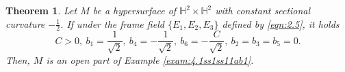 \documentclass[reqno]{amsart}%
\newtheorem{theorem}{Theorem}[section]   %
\theoremstyle{definition}
\numberwithin{equation}{section}
\begin{document}
\begin{theorem}\label{thm:4.1abc}
Let $M$ be a hypersurface of $\mathbb{H}^2\times \mathbb{H}^2$ with constant sectional curvature $-\frac{1}{2}$.
If under the frame field $\{E_1,E_2,E_3\}$ defined by \eqref{eqn:2.5}, it holds
$$
C>0,\ b_1=\frac{1}{\sqrt{2}},\ b_4=-\frac{1}{\sqrt{2}},\ b_6=-\frac{C}{\sqrt{2}},\ b_2=b_3=b_5=0.
$$
%
Then, $M$ is an open part of Example \ref{exam:4.1ss1ss11ab1}.
\end{theorem}
%
\end{document}
